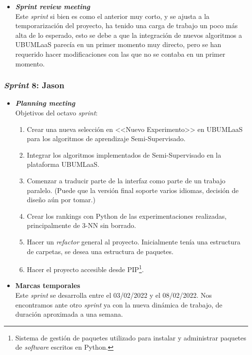 \begin{itemize}
\item \textbf{\textit{Sprint review meeting}}\\
Este \textit{sprint} si bien es como el anterior muy corto, y se ajusta a la temporarización del proyecto, ha tenido una carga de trabajo un poco más alta de lo esperado, esto se debe a que la integración de nuevos algoritmos a UBUMLaaS parecía en un primer momento muy directo, pero se han requerido hacer modificaciones con las que no se contaba en un primer momento.

\end{itemize}

\subsubsection{\textit{Sprint} 8: Jason}
\begin{itemize}
\item \textbf{\textit{Planning meeting}}\\
Objetivos del octavo \textit{sprint}:
\begin{enumerate}
\item Crear una nueva selección en <<Nuevo Experimento>> en UBUMLaaS para los algoritmos de aprendizaje Semi-Supervisado.
\item Integrar los algoritmos implementados de Semi-Supervisado en la plataforma UBUMLaaS.
\item Comenzar a traducir parte de la interfaz como parte de un trabajo paralelo. (Puede que la versión final soporte varios idiomas, decisión de diseño aún por tomar.)
\item Crear los rankings con Python de las experimentaciones realizadas, principalmente de 3-NN sin borrado.
\item Hacer un \textit{refactor} general al proyecto. Inicialmente tenía una estructura de carpetas, se desea una estructura de paquetes.
\item Hacer el proyecto accesible desde PIP\footnote{Sistema de gestión de paquetes utilizado para instalar y administrar paquetes de \textit{software} escritos en Python.}.
\end{enumerate}

\item \textbf{Marcas temporales}\\
Este \textit{sprint} se desarrolla entre el 03/02/2022 y el 08/02/2022. Nos encontramos ante otro \textit{sprint} ya con la nueva dinámica de trabajo, de duración aproximada a una semana.


\end{itemize}
